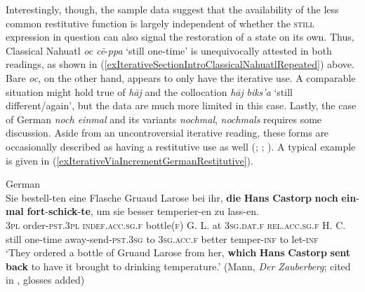 Interestingly, though, the sample data suggest that the availability of the less common restitutive function is largely independent of whether the \textsc{still} expression in question can also signal the restoration of a state on its own. Thus, Classical Nahuatl \textit{oc} \textit{cē}-\textit{ppa} \lq{}still one-time\rq{ }is unequivocally attested in both readings, as shown in (\ref{exIterativeSectionIntroClassicalNahuatlRepeated}) above. Bare \textit{oc}, on the other hand, appears to only have the iterative use. A comparable situation might hold true of  \textit{hāj} and the collocation \textit{hāj} \textit{biks'a} \lq still different/again\rq{}, but the data are much more limited in this case. Lastly, the case of German \textit{noch einmal} and its variants \textit{nochmal}, \textit{nochmals} requires some discussion. Aside from an uncontroversial iterative reading, these forms are occasionally described as having a restitutive use as well (\cite[s.v. \textit{noch einmal}, \textit{nochmal}, \textit{nochmals}]{Duden}; \cite[105]{Nederstigt2003}; \cite{Shetter1966}). A typical example is given in (\ref{exIterativeViaIncrementGermanRestitutive}).\pagebreak

\begin{exe}
	\ex German\label{exIterativeViaIncrementGermanRestitutive}\\
	\gll Sie bestell-ten eine Flasche Gruaud Larose bei ihr, \textbf{die} {\textbf{Hans} \textbf{Castorp}} \textbf{noch} \textbf{ein}-\textbf{mal} \textbf{fort}-\textbf{schick}-\textbf{te}, um sie besser temperier-en zu lass-en.\\
	3\textsc{pl} order-\textsc{pst}.3\textsc{pl} \textsc{indef}.\textsc{acc}.\textsc{sg}.\textsc{f} bottle(\textsc{f}) G. L. at 3\textsc{sg}.\textsc{dat}.\textsc{f} \textsc{rel}.\textsc{acc}.\textsc{sg}.\textsc{f} {H. C.} still one-time away-send-\textsc{pst}.3\textsc{sg} to 3\textsc{sg}.\textsc{acc}.\textsc{f} better temper-\textsc{inf} to let-\textsc{inf}\\
	\glt \lq They ordered a bottle of Gruaud Larose from her, \textbf{which} \textbf{Hans} \textbf{Castorp} \textbf{sent} \textbf{back} to have it brought to drinking temperature.' (Mann, \textit{Der Zauberberg}; cited in \cite[61]{Shetter1966},  glosses added)
\end{exe}

